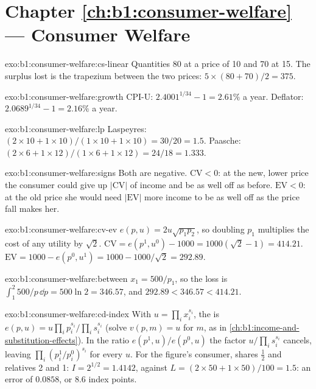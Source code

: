\section*{Chapter \ref{ch:b1:consumer-welfare} --- Consumer Welfare}

\begin{solution}{exo:b1:consumer-welfare:cs-linear}
Quantities 80 at a price of 10 and 70 at 15. The surplus lost is the
trapezium between the two prices: $5 \times (80 + 70)/2 = 375$.
\end{solution}

\begin{solution}{exo:b1:consumer-welfare:growth}
CPI-U: $2.4001^{1/34} - 1 = 2.61\%$ a year. Deflator: $2.0689^{1/34} - 1 = 2.16\%$
a year.
\end{solution}

\begin{solution}{exo:b1:consumer-welfare:lp}
Laspeyres: $(2 \times 10 + 1 \times 10)/(1 \times 10 + 1 \times 10) = 30/20 = 1.5$.
Paasche: $(2 \times 6 + 1 \times 12)/(1 \times 6 + 1 \times 12) = 24/18 = 1.333$.
\end{solution}

\begin{solution}{exo:b1:consumer-welfare:signs}
Both are negative. $\mathrm{CV} < 0$: at the new, lower price the consumer
could give up $|\mathrm{CV}|$ of income and be as well off as before.
$\mathrm{EV} < 0$: at the old price she would need $|\mathrm{EV}|$ more income to
be as well off as the price fall makes her.
\end{solution}

\begin{solution}{exo:b1:consumer-welfare:cv-ev}
$e(p, u) = 2u\sqrt{p_1p_2}$, so doubling $p_1$ multiplies the cost of any
utility by $\sqrt 2$. $\mathrm{CV} = e(p^1, u^0) - 1000 = 1000(\sqrt 2 - 1) = 414.21$.
$\mathrm{EV} = 1000 - e(p^0, u^1) = 1000 - 1000/\sqrt 2 = 292.89$.
\end{solution}

\begin{solution}{exo:b1:consumer-welfare:between}
$x_1 = 500/p_1$, so the loss is $\int_1^2 500/p\,\dd p = 500\ln 2 = 346.57$, and
$292.89 < 346.57 < 414.21$.
\end{solution}

\begin{solution}{exo:b1:consumer-welfare:cd-index}
With $u = \prod_i x_i^{s_i}$, the  is
$e(p, u) = u\prod_i p_i^{s_i}/\prod_i s_i^{s_i}$ (solve $v(p, m) = u$ for $m$, as in
\cref{ch:b1:income-and-substitution-effects}). In the ratio $e(p^1, u)/e(p^0, u)$
the factor $u/\prod_i s_i^{s_i}$ cancels, leaving $\prod_i(p_i^1/p_i^0)^{s_i}$ for
every $u$. For the figure's consumer, shares $\tfrac12$ and relatives 2 and 1:
$I = 2^{1/2} = 1.4142$, against $L = (2 \times 50 + 1 \times 50)/100 = 1.5$: an error of
$0.0858$, or 8.6 index points.
\end{solution}

